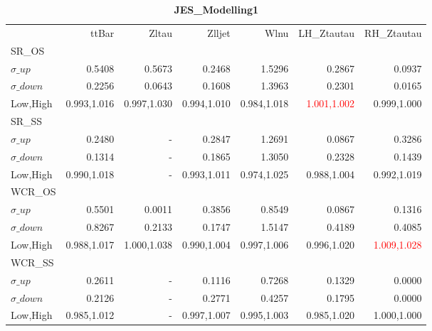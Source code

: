 \documentclass[11pt,oneside,a4paper]{article}
\begin{document}
\begin{table}
\caption{\bf{JES\_Modelling1}}
\centering
\begin{tabular}{lrrrrrr}
& ttBar & Zltau & Zlljet & Wlnu & LH\_Ztautau & RH\_Ztautau \\

SR\_OS &  &  &  &  &  &  \\
$\sigma\_up$ & 0.5408 & 0.5673 & 0.2468 & 1.5296 & 0.2867 & 0.0937 \\
$\sigma\_down$ & 0.2256 & 0.0643 & 0.1608 & 1.3963 & 0.2301 & 0.0165 \\
Low,High & 0.993,1.016 & 0.997,1.030 & 0.994,1.010 & 0.984,1.018 & \textcolor{red}{1.001,1.002} & 0.999,1.000 \\

\hline
SR\_SS &  &  &  &  &  &  \\
$\sigma\_up$ & 0.2480 & - & 0.2847 & 1.2691 & 0.0867 & 0.3286 \\
$\sigma\_down$ & 0.1314 & - & 0.1865 & 1.3050 & 0.2328 & 0.1439 \\
Low,High & 0.990,1.018 & - & 0.993,1.011 & 0.974,1.025 & 0.988,1.004 & 0.992,1.019 \\

\hline
WCR\_OS &  &  &  &  &  &  \\
$\sigma\_up$ & 0.5501 & 0.0011 & 0.3856 & 0.8549 & 0.0867 & 0.1316 \\
$\sigma\_down$ & 0.8267 & 0.2133 & 0.1747 & 1.5147 & 0.4189 & 0.4085 \\
Low,High & 0.988,1.017 & 1.000,1.038 & 0.990,1.004 & 0.997,1.006 & 0.996,1.020 & \textcolor{red}{1.009,1.028} \\

\hline
WCR\_SS &  &  &  &  &  &  \\
$\sigma\_up$ & 0.2611 & - & 0.1116 & 0.7268 & 0.1329 & 0.0000 \\
$\sigma\_down$ & 0.2126 & - & 0.2771 & 0.4257 & 0.1795 & 0.0000 \\
Low,High & 0.985,1.012 & - & 0.997,1.007 & 0.995,1.003 & 0.985,1.020 & 1.000,1.000 \\

\end{tabular}
\end{table}
\end{document}
